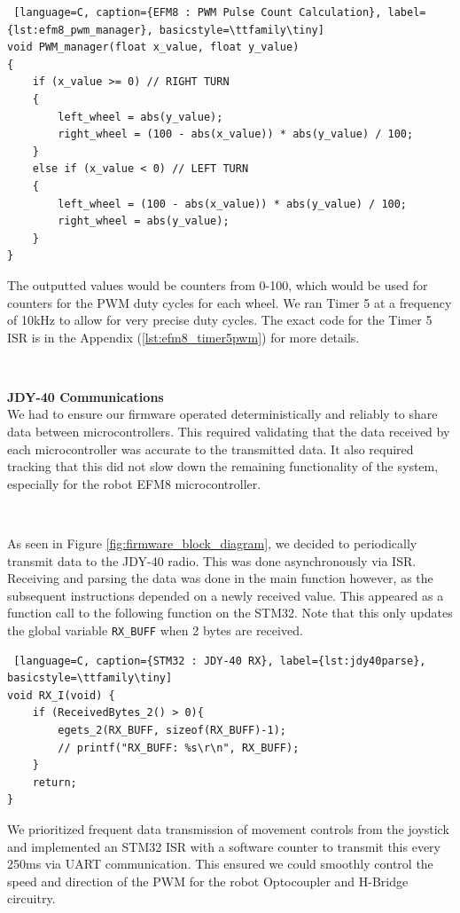 \documentclass{article}
\begin{document}
\begin{lstlisting} [language=C, caption={EFM8 : PWM Pulse Count Calculation}, label={lst:efm8_pwm_manager}, basicstyle=\ttfamily\tiny]
void PWM_manager(float x_value, float y_value)
{
    if (x_value >= 0) // RIGHT TURN
    {
        left_wheel = abs(y_value);
        right_wheel = (100 - abs(x_value)) * abs(y_value) / 100;
    }
    else if (x_value < 0) // LEFT TURN
    {
        left_wheel = (100 - abs(x_value)) * abs(y_value) / 100;
        right_wheel = abs(y_value);
    }
}
\end{lstlisting}

The outputted values would be counters from 0-100, which would be used for counters for the PWM duty cycles for each wheel. We ran Timer 5 at a frequency of 10kHz to allow for very precise duty cycles. The exact code for the Timer 5 ISR is in the Appendix (\ref{lst:efm8_timer5pwm}) for more details.

\

\textbf{JDY-40 Communications} \\
We had to ensure our firmware operated deterministically and reliably to share data between microcontrollers.
This required validating that the data received by each microcontroller was accurate to the transmitted data. It also required tracking
that this did not slow down the remaining functionality of the system, especially for the robot EFM8 microcontroller.

\

As seen in Figure \ref{fig:firmware_block_diagram}, we decided to periodically transmit data to the JDY-40 radio. This was done
asynchronously via ISR. Receiving and parsing the data was done in the main function however,
as the subsequent instructions depended on a newly received value. This appeared as a function call to the following function on the STM32.
Note that this only updates the global variable \texttt{RX\_BUFF} when 2 bytes are received.

\begin{lstlisting} [language=C, caption={STM32 : JDY-40 RX}, label={lst:jdy40parse}, basicstyle=\ttfamily\tiny]
void RX_I(void) {
	if (ReceivedBytes_2() > 0){
		egets_2(RX_BUFF, sizeof(RX_BUFF)-1);
		// printf("RX_BUFF: %s\r\n", RX_BUFF);
	}
	return;
}
\end{lstlisting}

We prioritized frequent data transmission of movement controls from the joystick and implemented an STM32 ISR with a software counter
to transmit this every 250ms via UART communication. This ensured we could smoothly control the speed and
direction of the PWM for the robot Optocoupler and H-Bridge circuitry.
\end{document}
